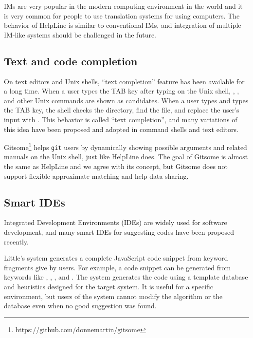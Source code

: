\documentclass[manuscript,anonymous,review]{acmart}
\def\HL{\textsf{HelpLine}}
\def\GIT{\texttt{git}}
\begin{document}
IMs are very popular in the modern computing environment in the world
and it is very common for people to 
use translation systems for using computers.
%
The behavior of {\HL} is similar to conventional IMs, and
integration of multiple IM-like systems should be challenged in the future.

\subsection{Text and code completion}

On text editors and Unix shells,
``text completion'' feature has been available for a long time.
%
When a user types the TAB key after typing  on the Unix shell,
, , and other Unix commands are shown as candidates.
When a user types  and types the TAB key,
the shell checks the directory, find the  file, and
replace the user's input with .
This behavior is called ``text completion'', and many variations of
this idea have been proposed and adopted in command shells and text editors.


Gitsome\footnote{\textsf{https:{\slash}{\slash}github.com{\slash}donnemartin{\slash}gitsome}}
helps {\GIT} users by
dynamically showing possible arguments and related manuals on the Unix shell,
just like {\HL} does.
The goal of Gitsome is almost the same as {\HL} and we agree with its concept,
but Gitsome does not support flexible approximate matching and
help data sharing.

\subsection{Smart IDEs}

Integrated Development Environments (IDEs) are widely used for
software development, and
many smart IDEs for suggesting codes have been proposed recently.

Little's system\cite{Little:2006:TKC:1166253.1166275}
generates a complete JavaScript code snippet from keyword fragments
give by users.
For example, a code snippet
can be generated from keywords like
,
,
,
and .
The system generates the code using a template database and heuristics
designed for the target system.
It is useful for a specific environment, but
users of the system cannot modify the algorithm or the database
even when no good suggestion was found.
\end{document}
